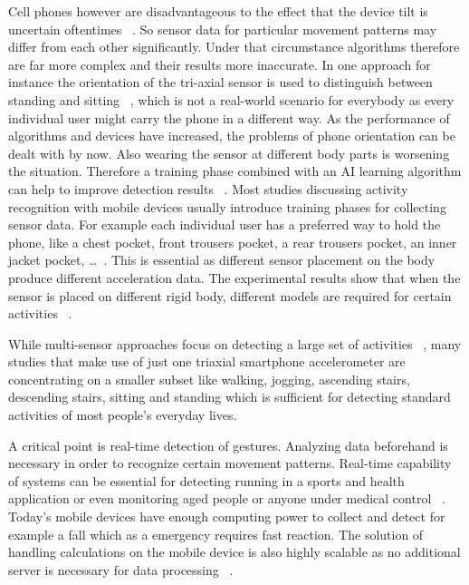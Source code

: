 \documentclass[conference]{IEEEtran}
\begin{document}
Cell phones however are disadvantageous to the effect that the device tilt is uncertain oftentimes ~\cite{Brezmes2009}. So sensor data for particular movement patterns may differ from each other significantly. Under that circumstance algorithms therefore are far more complex and their results more inaccurate. In one approach for instance the orientation of the tri-axial sensor is used to distinguish between standing and sitting ~\cite{Kwapisz2011}, which is not a real-world scenario for everybody as every individual user might carry the phone in a different way. As the performance of algorithms and devices have increased, the problems of phone orientation can be dealt with by now. Also wearing the sensor at different body parts is worsening the situation. Therefore a training phase combined with an \ac{AI} learning algorithm can help to improve detection results ~\cite{Kwapisz2011,Bao2004}. Most studies discussing activity recognition with mobile devices usually introduce training phases for collecting sensor data. For example each individual user has a preferred way to hold the phone, like a chest pocket, front trousers pocket, a rear trousers pocket, an inner jacket pocket, \dots ~\cite{Brezmes2009}. This is essential as different sensor placement on the body produce different acceleration data. The experimental results show that when the sensor is placed on different rigid body, different models are required for certain activities ~\cite{Henpraserttae2011}.

While multi-sensor approaches focus on detecting a large set of activities ~\cite{Bao2004}, many studies that make use of just one triaxial smartphone accelerometer are concentrating on a smaller subset like walking, jogging, ascending stairs, descending stairs, sitting and standing which is sufficient for detecting standard activities of most people's everyday lives.

A critical point is real-time detection of gestures. Analyzing data beforehand is necessary in order to recognize certain movement patterns. Real-time capability of systems can be essential for detecting running in a sports and health application or even monitoring aged people or anyone under medical control ~\cite{Brezmes2009}. Today's mobile devices have enough computing power to collect and detect for example a fall which as a emergency requires fast reaction. The solution of handling calculations on the mobile device is also highly scalable as no additional server is necessary for data processing ~\cite{Kwapisz2011}.
\end{document}
